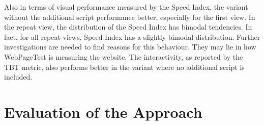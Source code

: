 
Also in terms of visual performance measured by the Speed Index, the variant without the additional script performance better, especially for the first view.
In the repeat view, the distribution of the Speed Index has bimodal tendencies.
In fact, for all repeat views, Speed Index has a slightly bimodal distribution.
Further investigations are needed to find reasons for this behaviour.
They may lie in how WebPageTest is measuring the website.
The interactivity, as reported by the TBT metric, also performs better in the variant where no additional script is included.




\section{Evaluation of the Approach}

































